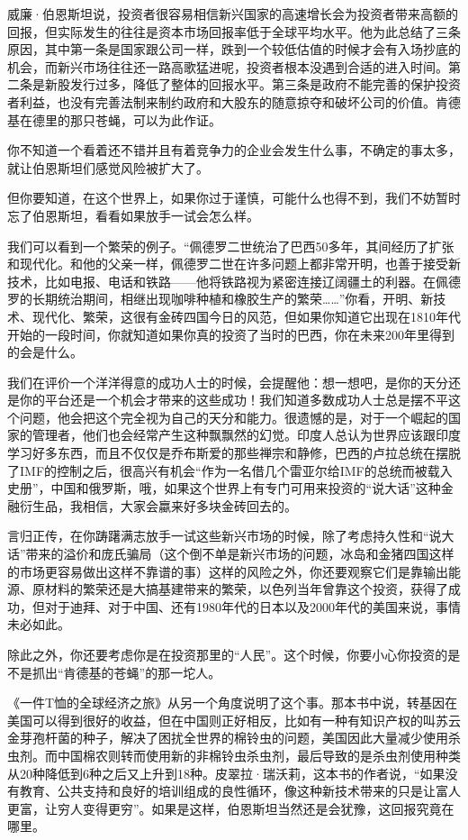 威廉·伯恩斯坦说，投资者很容易相信新兴国家的高速增长会为投资者带来高额的回报，但实际发生的往往是资本市场回报率低于全球平均水平。他为此总结了三条原因，其中第一条是国家跟公司一样，跌到一个较低估值的时候才会有入场抄底的机会，而新兴市场往往还一路高歌猛进呢，投资者根本没遇到合适的进入时间。第二条是新股发行过多，降低了整体的回报水平。第三条是政府不能完善的保护投资者利益，也没有完善法制来制约政府和大股东的随意掠夺和破坏公司的价值。肯德基在德里的那只苍蝇，可以为此作证。

你不知道一个看着还不错并且有着竞争力的企业会发生什么事，不确定的事太多，就让伯恩斯坦们感觉风险被扩大了。

但你要知道，在这个世界上，如果你过于谨慎，可能什么也得不到，我们不妨暂时忘了伯恩斯坦，看看如果放手一试会怎么样。

我们可以看到一个繁荣的例子。``佩德罗二世统治了巴西50多年，其间经历了扩张和现代化。和他的父亲一样，佩德罗二世在许多问题上都非常开明，也善于接受新技术，比如电报、电话和铁路------他将铁路视为紧密连接辽阔疆土的利器。在佩德罗的长期统治期间，相继出现咖啡种植和橡胶生产的繁荣\ldots{}\ldots{}''你看，开明、新技术、现代化、繁荣，这很有金砖四国今日的风范，但如果你知道它出现在1810年代开始的一段时间，你就知道如果你真的投资了当时的巴西，你在未来200年里得到的会是什么。

我们在评价一个洋洋得意的成功人士的时候，会提醒他：想一想吧，是你的天分还是你的平台还是一个机会才带来的这些成功！我们知道多数成功人士总是摆不平这个问题，他会把这个完全视为自己的天分和能力。很遗憾的是，对于一个崛起的国家的管理者，他们也会经常产生这种飘飘然的幻觉。印度人总认为世界应该跟印度学习好多东西，而且不仅仅是乔布斯爱的那些禅宗和静修，巴西的卢拉总统在摆脱了IMF的控制之后，很高兴有机会``作为一名借几个雷亚尔给IMF的总统而被载入史册''，中国和俄罗斯，哦，如果这个世界上有专门可用来投资的``说大话''这种金融衍生品，我相信，大家会蠃来好多块金砖回去的。

言归正传，在你踌躇满志放手一试这些新兴市场的时候，除了考虑持久性和``说大话''带来的溢价和庞氏骗局（这个倒不单是新兴市场的问题，冰岛和金猪四国这样的市场更容易做出这样不靠谱的事）这样的风险之外，你还要观察它们是靠输出能源、原材料的繁荣还是大搞基建带来的繁荣，以色列当年曾靠这个投资，获得了成功，但对于迪拜、对于中国、还有1980年代的日本以及2000年代的美国来说，事情未必如此。

除此之外，你还要考虑你是在投资那里的``人民''。这个时候，你要小心你投资的是不是抓出``肯德基的苍蝇''的那一坨人。

《一件T恤的全球经济之旅》从另一个角度说明了这个事。那本书中说，转基因在美国可以得到很好的收益，但在中国则正好相反，比如有一种有知识产权的叫苏云金芽孢杆菌的种子，解决了困扰全世界的棉铃虫的问题，美国因此大量减少使用杀虫剂。而中国棉农则转而使用新的非棉铃虫杀虫剂，最后导致的是杀虫剂使用种类从20种降低到6种之后又上升到18种。皮翠拉·瑞沃莉，这本书的作者说，``如果没有教育、公共支持和良好的培训组成的良性循环，像这种新技术带来的只是让富人更富，让穷人变得更穷''。如果是这样，伯恩斯坦当然还是会犹豫，这回报究竟在哪里。

